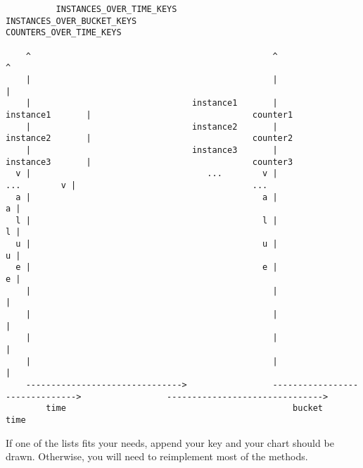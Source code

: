 \documentclass[a4paper,11pt]{article}
\begin{document}
\begin{lstlisting}
          INSTANCES_OVER_TIME_KEYS                         INSTANCES_OVER_BUCKET_KEYS                        COUNTERS_OVER_TIME_KEYS

    ^                                                ^                                                ^                                                         
    |                                                |                                                |                                                         
    |                                instance1       |                                instance1       |                                counter1                
    |                                instance2       |                                instance2       |                                counter2                
    |                                instance3       |                                instance3       |                                counter3                
  v |                                   ...        v |                                   ...        v |                                   ...                   
  a |                                              a |                                              a |                                                         
  l |                                              l |                                              l |                                                         
  u |                                              u |                                              u |                                                         
  e |                                              e |                                              e |                                                         
    |                                                |                                                |                                                         
    |                                                |                                                |                                                         
    |                                                |                                                |                                                         
    |                                                |                                                |                                                         
    ------------------------------->                 ------------------------------->                 ------------------------------->                          
        time                                             bucket                                           time                                                  
\end{lstlisting}
If one of the lists fits your needs, append your key and your chart should be drawn. Otherwise, you will need to reimplement most of the methods. 
\end{document}
